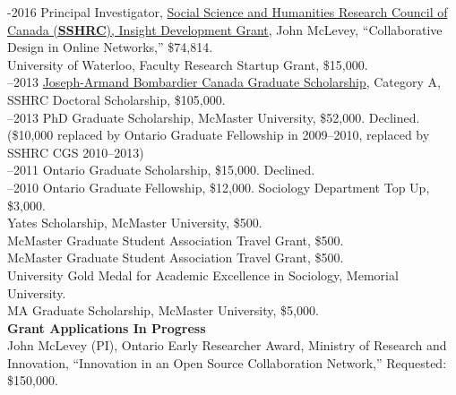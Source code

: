 \documentclass[9pt,usenames,dvipsnames]{article}
\begin{document}
-2016 Principal Investigator, \href{http://www.sshrc-crsh.gc.ca/funding-financement/programs-programmes/insight_development_grants-su
bventions_de_developpement_savoir-eng.aspx}{Social Science and Humanities Research Council of Canada (\textbf{SSHRC}), Insight Development Grant}, John McLevey, ``Collaborative Design in Online Networks,'' \$74,814. \\

 University of Waterloo, Faculty Research Startup Grant, \$15,000. \\

–2013 \href{http://www.sshrc-crsh.gc.ca/funding-financement/programs-programmes/fellowships/doctoral-doctorat-eng.aspx}{Joseph-Armand Bombardier Canada Graduate Scholarship}, Category A, SSHRC Doctoral Scholarship, \$105,000.\\

–2013 PhD Graduate Scholarship, McMaster University, \$52,000. Declined. (\$10,000 replaced by Ontario Graduate Fellowship in 2009–2010, replaced by SSHRC CGS 2010–2013)\\

–2011 Ontario Graduate Scholarship, \$15,000. Declined.\\

–2010 Ontario Graduate Fellowship, \$12,000. Sociology Department Top Up, \$3,000.\\

 Yates Scholarship, McMaster University, \$500.\\

 McMaster Graduate Student Association Travel Grant, \$500.\\

 McMaster Graduate Student Association Travel Grant, \$500.\\

 University Gold Medal for Academic Excellence in Sociology, Memorial University.\\

 MA Graduate Scholarship, McMaster University, \$5,000.\\


\noindent \textbf{Grant Applications In Progress} \\

\ind John McLevey (PI), Ontario Early Researcher Award, Ministry of Research and Innovation, ``Innovation in an Open Source Collaboration Network,'' Requested: \$150,000. \\
\end{document}
